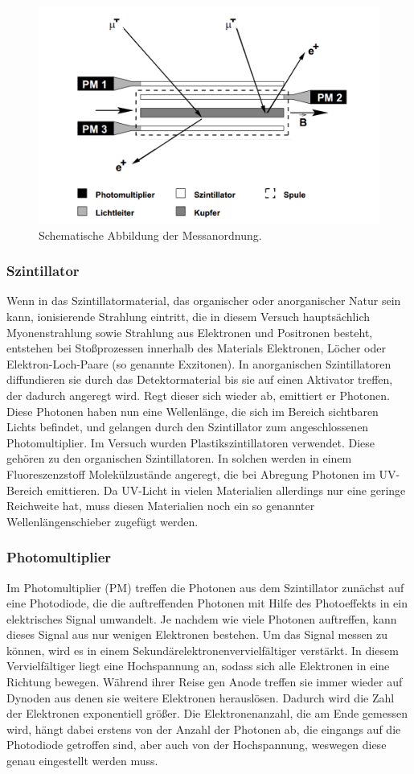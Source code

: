 \documentclass[slug=LM, room=Andreas-Schubert-Bau\,\ K\ 1A, supervisor=Anne-Sophie\ Berthold, coursedate=13.\ 12.\ 2019]{../../Lab_Report_LaTeX/lab_report}
\begin{document}
\begin{figure}[H]\centering
	\includegraphics[width=.5\columnwidth]{./Versuchsaufbau.png}
	\caption{Schematische Abbildung der Messanordnung.}
	\label{fig:aufbau}
\end{figure}

\subsubsection{Szintillator}
\label{sec:szinti}

Wenn in das Szintillatormaterial, das organischer oder anorganischer Natur sein kann, ionisierende
Strahlung eintritt, die in diesem Versuch hauptsächlich Myonenstrahlung sowie Strahlung 
aus Elektronen und Positronen besteht, entstehen bei Stoßprozessen innerhalb des Materials Elektronen, 
Löcher oder Elektron-Loch-Paare (so genannte Exzitonen). 
In anorganischen Szintillatoren diffundieren sie durch das 
Detektormaterial bis sie auf einen Aktivator treffen, der dadurch angeregt wird. Regt dieser sich
wieder ab, emittiert er Photonen. Diese Photonen haben nun eine Wellenlänge, die sich im Bereich 
sichtbaren Lichts befindet, und gelangen durch den Szintillator zum angeschlossenen 
Photomultiplier.
Im Versuch wurden Plastikszintillatoren verwendet. Diese gehören zu den organischen Szintillatoren.
In solchen werden in einem Fluoreszenzstoff Molekülzustände angeregt, die bei Abregung Photonen
im UV-Bereich emittieren. Da UV-Licht in vielen Materialien allerdings nur eine geringe
Reichweite hat, muss diesen Materialien noch ein so genannter Wellenlängenschieber zugefügt werden.

\subsubsection{Photomultiplier}
\label{sec:photomulti}

Im Photomultiplier (PM) treffen die Photonen aus dem Szintillator zunächst auf eine Photodiode,
die die auftreffenden Photonen mit Hilfe des Photoeffekts in ein elektrisches Signal umwandelt.
Je nachdem wie viele Photonen auftreffen, kann dieses Signal aus nur wenigen Elektronen bestehen.
Um das Signal messen zu können, wird es in einem Sekundärelektronenvervielfältiger verstärkt.
In diesem Vervielfältiger liegt eine Hochspannung an, sodass sich alle Elektronen in eine Richtung
bewegen. Während ihrer Reise gen Anode treffen sie immer wieder auf Dynoden aus denen sie 
weitere Elektronen herauslösen. Dadurch wird die Zahl der Elektronen exponentiell größer.
Die Elektronenanzahl, die am Ende gemessen wird, hängt dabei erstens von der Anzahl der Photonen
ab, die eingangs auf die Photodiode getroffen sind, aber auch von der Hochspannung, weswegen diese
genau eingestellt werden muss.
\end{document}
